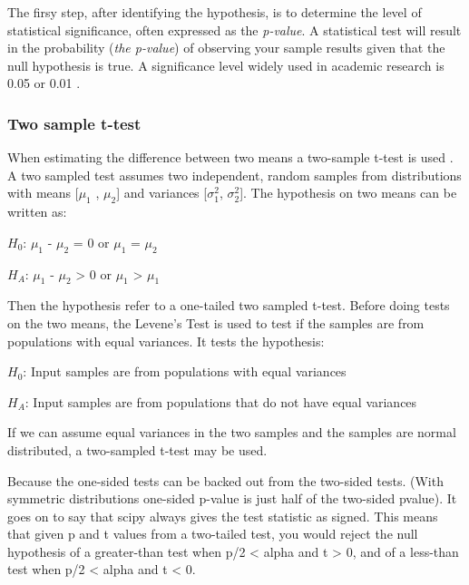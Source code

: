 The firsy step, after identifying the hypothesis, is to determine the level of statistical significance, often expressed as the \textit{p-value}. A statistical test will result in the probability (\textit{the p-value}) of observing your sample results given that the null hypothesis is true. A significance level widely used in academic research is 0.05 or 0.01 \citep{Walpole2012}. 


\subsubsection{Two sample t-test}\label{sec:t-test}
When estimating the difference between two means a two-sample t-test is used \citep{Walpole2012}. A two sampled test assumes two independent, random samples from distributions with means [$\mu_{1}$ , $\mu_{2}$] and variances [$\sigma_{1}^{2}$, $\sigma_{2}^{2}$]. %
The hypothesis on two means can be written as:\newline

\centerline{$H_{0}$: $\mu_{1}$ - $\mu_{2}$ = 0 or $\mu_{1}$ = $\mu_{2}$} 
\centerline{$H_{A}$: $\mu_{1}$ - $\mu_{2}$ > 0 or $\mu_{1}$ > $\mu_{1}$}
 
Then the hypothesis refer to a one-tailed two sampled t-test. Before doing tests on the two means, the Levene's Test is used to test if the samples are from populations with equal variances. It tests the hypothesis:\newline %

\centerline{$H_{0}$: Input samples are from populations with equal variances} 
\centerline{$H_{A}$: Input samples are from populations that do not have equal variances}

If we can assume equal variances in the two samples and the samples are normal distributed, a two-sampled t-test may be used. 

Because the one-sided tests can be backed out from the two-sided tests. (With symmetric distributions one-sided p-value is just half of the two-sided pvalue). It goes on to say that scipy always gives the test statistic as signed. This means that given p and t values from a two-tailed test, you would reject the null hypothesis of a greater-than test when p/2 < alpha and t > 0, and of a less-than test when p/2 < alpha and t < 0. %

